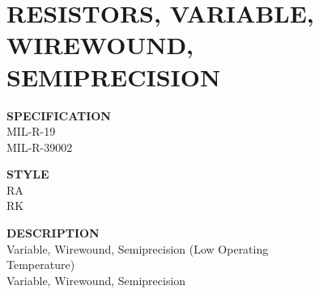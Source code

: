 \section{RESISTORS, VARIABLE, WIREWOUND, SEMIPRECISION}

\begin{minipage}[t]{0.24\textwidth}
    \textbf{SPECIFICATION}\\
    MIL-R-19\\MIL-R-39002
\end{minipage}
\hfill
\begin{minipage}[t]{0.12\textwidth}
    \textbf{STYLE}\\
    RA\\RK
\end{minipage}
\hfill
\begin{minipage}[t]{0.61\textwidth}
    \textbf{DESCRIPTION}\\
    Variable, Wirewound, Semiprecision (Low Operating \\Temperature)\\Variable, Wirewound, Semiprecision
\end{minipage}

